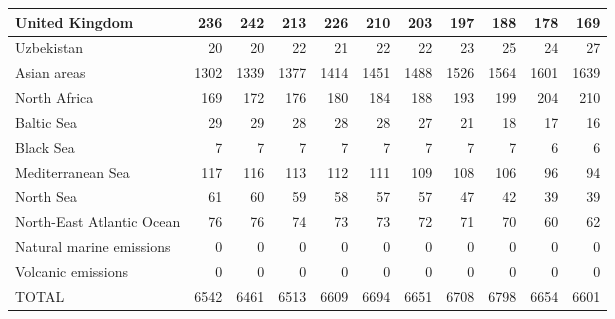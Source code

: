 \begin{table}
\begin{tabular}{|l|r|r|r|r|r|r|r|r|r|r|}
                United Kingdom&    236&    242&    213&    226&    210&    203&    197&    188&    178&    169\\\hline
                    Uzbekistan&     20&     20&     22&     21&     22&     22&     23&     25&     24&     27\\\hline
                   Asian areas&   1302&   1339&   1377&   1414&   1451&   1488&   1526&   1564&   1601&   1639\\\hline
                  North Africa&    169&    172&    176&    180&    184&    188&    193&    199&    204&    210\\\hline
                    Baltic Sea&     29&     29&     28&     28&     28&     27&     21&     18&     17&     16\\\hline
                     Black Sea&      7&      7&      7&      7&      7&      7&      7&      7&      6&      6\\\hline
             Mediterranean Sea&    117&    116&    113&    112&    111&    109&    108&    106&     96&     94\\\hline
                     North Sea&     61&     60&     59&     58&     57&     57&     47&     42&     39&     39\\\hline
     North-East Atlantic Ocean&     76&     76&     74&     73&     73&     72&     71&     70&     60&     62\\\hline
      Natural marine emissions&      0&      0&      0&      0&      0&      0&      0&      0&      0&      0\\\hline
            Volcanic emissions&      0&      0&      0&      0&      0&      0&      0&      0&      0&      0\\\hline\hline
                         TOTAL&   6542&   6461&   6513&   6609&   6694&   6651&   6708&   6798&   6654&   6601\\\hline
 \end{tabular}
 \end{table}
 
